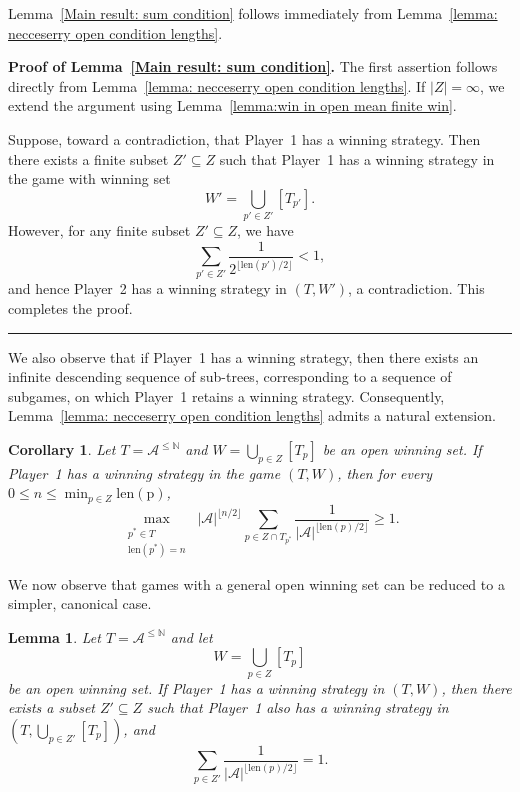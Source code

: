 \documentclass[a4,12pt]{article}%
\newtheorem{corollary}[theorem]{Corollary}
\newtheorem{lemma}[theorem]{Lemma}
\newenvironment{proof}[1][Proof]{\textbf{#1.} }{\ \rule{0.5em}{0.5em}}
\begin{document}
\medskip

Lemma~\ref{Main result: sum condition} follows immediately from Lemma~\ref{lemma: necceserry open condition lengths}.

\medskip

\begin{proof}[Proof of Lemma~\ref{Main result: sum condition}]
The first assertion follows directly from Lemma~\ref{lemma: necceserry open condition lengths}. 
If $|Z|=\infty$, we extend the argument using Lemma~\ref{lemma:win in open mean finite win}.

Suppose, toward a contradiction, that Player~1 has a winning strategy. Then there exists a finite subset $Z'\subseteq Z$ such that Player~1 has a winning strategy in the game with winning set
\[
W'=\bigcup_{p'\in Z'} [T_{p'}].
\]
However, for any finite subset $Z'\subseteq Z$, we have
\[
\sum_{p'\in Z'} \frac{1}{2^{\lfloor \mathrm{len}(p')/2 \rfloor}} < 1,
\]
and hence Player~2 has a winning strategy in $(T,W')$, a contradiction. This completes the proof.
\end{proof}

We also observe that if Player~1 has a winning strategy, then there exists an infinite descending sequence of sub-trees, corresponding to a sequence of subgames, on which Player~1 retains a winning strategy. Consequently, Lemma~\ref{lemma: necceserry open condition lengths} admits a natural extension.

\begin{corollary}
Let $T=\mathcal A^{\leq \mathbb N}$ and $W=\bigcup_{p\in Z}[T_p]$ be an open winning set.  
If Player~1 has a winning strategy in the game $(T,W)$, then for every $0 \le n\le \min_{p\in Z}{\mathrm{len(p)}}$, 
\[
\max_{\substack{p^{*}\in T \\ \mathrm{len}(p^{*})=n}}
\;
|\mathcal A|^{\lfloor n/2 \rfloor}
\sum_{p\in Z\cap T_{p^{*}}}
\frac{1}{|\mathcal A|^{\lfloor \mathrm{len}(p)/2 \rfloor}}
\ge 1.
\]
\end{corollary}

We now observe that games with a general open winning set can be reduced to a simpler, canonical case.

\begin{lemma} \label{Lemma: can take minimal size}
Let $T = \mathcal A^{\leq \mathbb N}$ and let 
\[
W = \bigcup_{p\in Z} [T_p]
\] 
be an open winning set. If Player~1 has a winning strategy in $(T,W)$, then there exists a subset $Z'\subseteq Z$ such that Player~1 also has a winning strategy in $(T,\bigcup_{p\in Z'} [T_p])$, and
\[
\sum_{p\in Z'} \frac{1}{|\mathcal A|^{\lfloor \mathrm{len}(p)/2 \rfloor}} = 1.
\]
\end{lemma}
\end{document}
